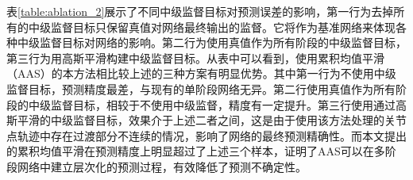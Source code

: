 \begin{table}[ht]
    \begin{center}
    \end{center}
    \caption{不同中级监督目标对预测误差的影响}
    \label{table:ablation_2}
    \end{table}

表\ref{table:ablation_2}展示了不同中级监督目标对预测误差的影响，第一行为去掉所有的中级监督目标只保留真值对网络最终输出的监督。它将作为基准网络来体现各种中级监督目标对网络的影响。第二行为使用真值作为所有阶段的中级监督目标，第三行为用高斯平滑构建中级监督目标。从表中可以看到，使用累积均值平滑（AAS）的本方法相比较上述的三种方案有明显优势。其中第一行为不使用中级监督目标，预测精度最差，与现有的单阶段网络无异。第二行使用真值作为所有阶段的中级监督目标，相较于不使用中级监督，精度有一定提升。第三行使用通过高斯平滑的中级监督目标，效果介于上述二者之间，这是由于使用该方法处理的关节点轨迹中存在过渡部分不连续的情况，影响了网络的最终预测精确性。而本文提出的累积均值平滑在预测精度上明显超过了上述三个样本，证明了AAS可以在多阶段网络中建立层次化的预测过程，有效降低了预测不确定性。

